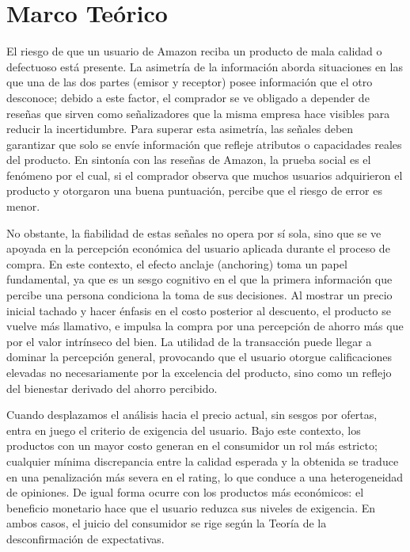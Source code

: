 \documentclass[oneside,11pt]{Latex/Classes/PhDthesisPSnPDF}
\begin{document}
\chapter{Marco Teórico}

El riesgo de que un usuario de Amazon reciba un producto de mala calidad
o defectuoso está presente. La asimetría de la información aborda
situaciones en las que una de las dos partes (emisor y receptor) posee
información que el otro desconoce; debido a este factor, el comprador se
ve obligado a depender de reseñas que sirven como señalizadores que la
misma empresa hace visibles para reducir la incertidumbre. Para superar
esta asimetría, las señales deben garantizar que solo se envíe
información que refleje atributos o capacidades reales del producto. En
sintonía con las reseñas de Amazon, la prueba social es el fenómeno por
el cual, si el comprador observa que muchos usuarios adquirieron el
producto y otorgaron una buena puntuación, percibe que el riesgo de
error es menor.

No obstante, la fiabilidad de estas señales no opera por sí sola, sino
que se ve apoyada en la percepción económica del usuario aplicada
durante el proceso de compra. En este contexto, el efecto anclaje
(anchoring) toma un papel fundamental, ya que es un sesgo cognitivo en
el que la primera información que percibe una persona condiciona la toma
de sus decisiones. Al mostrar un precio inicial tachado y hacer énfasis
en el costo posterior al descuento, el producto se vuelve más llamativo,
e impulsa la compra por una percepción de ahorro más que por el valor
intrínseco del bien. La utilidad de la transacción puede llegar a
dominar la percepción general, provocando que el usuario otorgue
calificaciones elevadas no necesariamente por la excelencia del
producto, sino como un reflejo del bienestar derivado del ahorro
percibido.

Cuando desplazamos el análisis hacia el precio actual, sin sesgos por
ofertas, entra en juego el criterio de exigencia del usuario. Bajo este
contexto, los productos con un mayor costo generan en el consumidor un
rol más estricto; cualquier mínima discrepancia entre la calidad
esperada y la obtenida se traduce en una penalización más severa en el
rating, lo que conduce a una heterogeneidad de opiniones. De igual forma
ocurre con los productos más económicos: el beneficio monetario hace que
el usuario reduzca sus niveles de exigencia. En ambos casos, el juicio
del consumidor se rige según la Teoría de la desconfirmación de
expectativas.
\end{document}
